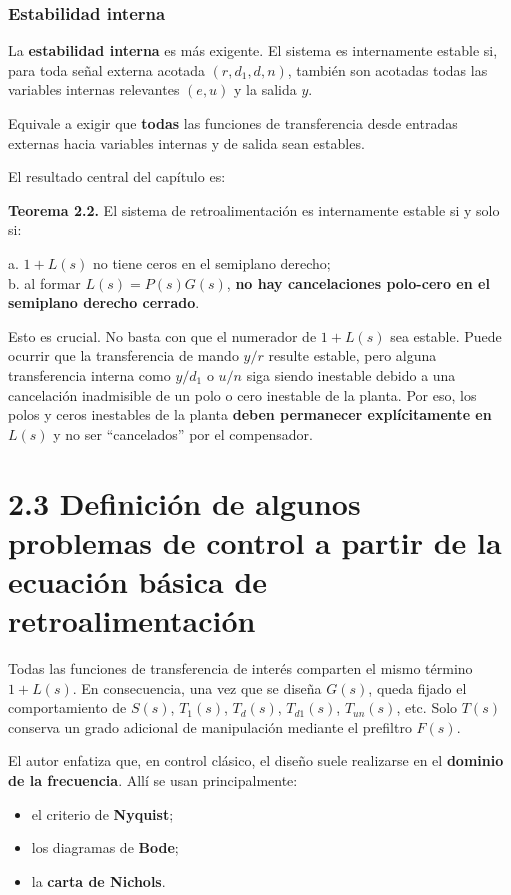 \subsubsection{Estabilidad interna}
La \textbf{estabilidad interna} es más exigente. El sistema es internamente estable si, para toda señal externa acotada \((r, d_1, d, n)\), también son acotadas todas las variables internas relevantes \((e, u)\) y la salida \(y\).

Equivale a exigir que \textbf{todas} las funciones de transferencia desde entradas externas hacia variables internas y de salida sean estables.

El resultado central del capítulo es:

\textbf{Teorema 2.2.} El sistema de retroalimentación es internamente estable si y solo si:

a. \(1+L(s)\) no tiene ceros en el semiplano derecho;\\
b. al formar \(L(s)=P(s)G(s)\), \textbf{no hay cancelaciones polo-cero en el semiplano derecho cerrado}.

Esto es crucial. No basta con que el numerador de \(1+L(s)\) sea estable. Puede ocurrir que la transferencia de mando \(y/r\) resulte estable, pero alguna transferencia interna como \(y/d_1\) o \(u/n\) siga siendo inestable debido a una cancelación inadmisible de un polo o cero inestable de la planta. Por eso, los polos y ceros inestables de la planta \textbf{deben permanecer explícitamente en \(L(s)\)} y no ser “cancelados” por el compensador.



\section{2.3 Definición de algunos problemas de control a partir de la ecuación básica de retroalimentación}
Todas las funciones de transferencia de interés comparten el mismo término \(1+L(s)\). En consecuencia, una vez que se diseña \(G(s)\), queda fijado el comportamiento de \(S(s)\), \(T_1(s)\), \(T_d(s)\), \(T_{d1}(s)\), \(T_{un}(s)\), etc. Solo \(T(s)\) conserva un grado adicional de manipulación mediante el prefiltro \(F(s)\).

El autor enfatiza que, en control clásico, el diseño suele realizarse en el \textbf{dominio de la frecuencia}. Allí se usan principalmente:

\begin{itemize}
  \item el criterio de \textbf{Nyquist};
  \item los diagramas de \textbf{Bode};
  \item la \textbf{carta de Nichols}.
\end{itemize}

